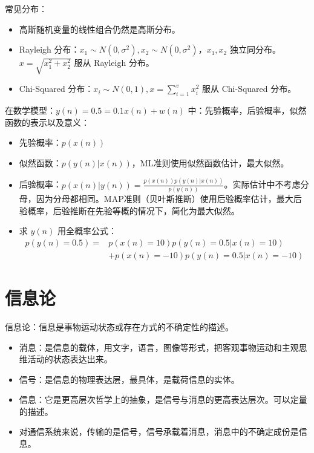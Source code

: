 \begin{remark}
    常见分布：
    \begin{itemize}
        \item 高斯随机变量的线性组合仍然是高斯分布。
        \item Rayleigh 分布：$x_1\sim N(0, \sigma^2), x_2\sim N(0, \sigma^2)$，$x_1,x_2$ 独立同分布。$x = \sqrt{x_1^2 + x_2^2}$ 服从 Rayleigh 分布。   
        \item Chi-Squared 分布：$x_i\sim N(0, 1), x = \sum_{i = 1}^{v} x_i^2$ 服从 Chi-Squared 分布。
    \end{itemize}
\end{remark}

\begin{remark}
    在数学模型：$y(n) = 0.5 = 0.1x(n) + w(n)$ 中：先验概率，后验概率，似然函数的表示以及意义：
    \begin{itemize}
        \item 先验概率：$p(x(n))$
        \item 似然函数：$p(y(n)|x(n))$，ML准则使用似然函数估计，最大似然。
        \item 后验概率：$p(x(n)|y(n)) = \frac{p(x(n))p(y(n)|x(n))}{p(y(n))}$。实际估计中不考虑分母，因为分母都相同。MAP准则（贝叶斯推断）使用后验概率估计，最大后验概率，后验推断在先验等概的情况下，简化为最大似然。
        \item 求 $y(n)$ 用全概率公式：\begin{align*}
            p(y(n) = 0.5) =& p(x(n) = 10)p(y(n) = 0.5 | x(n) = 10) \\
            &+ p(x(n) = -10)p(y(n) = 0.5 | x(n) = -10)
        \end{align*}
    \end{itemize}
\end{remark}

\section{信息论}
\begin{remark}
    信息论：信息是事物运动状态或存在方式的不确定性的描述。
    \begin{itemize}
        \item 消息：是信息的载体，用文字，语言，图像等形式，把客观事物运动和主观思维活动的状态表达出来。
        \item 信号：是信息的物理表达层，最具体，是载荷信息的实体。
        \item 信息：它是更高层次哲学上的抽象，是信号与消息的更高表达层次。可以定量的描述。
        \item 对通信系统来说，传输的是信号，信号承载着消息，消息中的不确定成份是信息。
    \end{itemize}
\end{remark}

